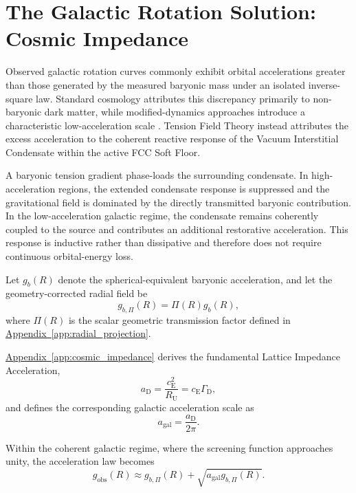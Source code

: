 \section{The Galactic Rotation Solution: Cosmic Impedance}

Observed galactic rotation curves commonly exhibit orbital accelerations greater than those generated by the measured baryonic mass under an isolated inverse-square law. Standard cosmology attributes this discrepancy primarily to non-baryonic dark matter, while modified-dynamics approaches introduce a characteristic low-acceleration scale \cite{Milgrom_1983}. Tension Field Theory instead attributes the excess acceleration to the coherent reactive response of the Vacuum Interstitial Condensate within the active FCC Soft Floor.

A baryonic tension gradient phase-loads the surrounding condensate. In high-acceleration regions, the extended condensate response is suppressed and the gravitational field is dominated by the directly transmitted baryonic contribution. In the low-acceleration galactic regime, the condensate remains coherently coupled to the source and contributes an additional restorative acceleration. This response is inductive rather than dissipative and therefore does not require continuous orbital-energy loss.

Let $g_b(R)$ denote the spherical-equivalent baryonic acceleration, and let the geometry-corrected radial field be
\begin{equation}
    g_{b,\Pi}(R) = \Pi(R)g_b(R),
\end{equation}
where $\Pi(R)$ is the scalar geometric transmission factor defined in \hyperref[app:radial_projection]{Appendix~\ref*{app:radial_projection}}.

\hyperref[app:cosmic_impedance]{Appendix~\ref*{app:cosmic_impedance}} derives the fundamental Lattice Impedance Acceleration,
\begin{equation}
    a_{\mathrm{D}} = \frac{c_{\mathrm{E}}^2}{R_{\mathrm{U}}} = c_{\mathrm{E}}\Gamma_{\mathrm{D}},
\end{equation}
and defines the corresponding galactic acceleration scale as
\begin{equation}
    a_{\mathrm{gal}} = \frac{a_{\mathrm{D}}}{2\pi}.
\end{equation}

Within the coherent galactic regime, where the screening function approaches unity, the acceleration law becomes
\begin{equation}
    g_{\mathrm{obs}}(R) \approx g_{b,\Pi}(R) + \sqrt{ a_{\mathrm{gal}}g_{b,\Pi}(R) }.
\end{equation}

